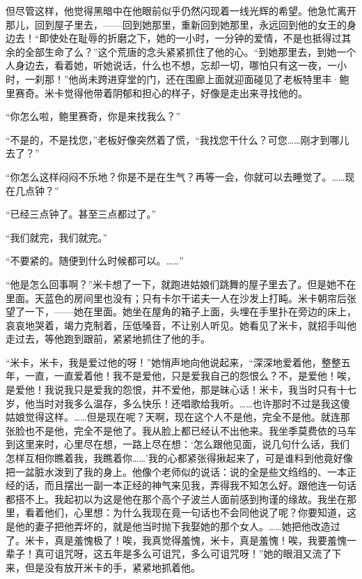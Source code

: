 \par 但尽管这样，他觉得黑暗中在他眼前似乎仍然闪现着一线光辉的希望。他急忙离开那儿，回到屋子里去，——回到她那里，重新回到她那里，永远回到他的女王的身边去！“即使处在耻辱的折磨之下，她的一小时，一分钟的爱情，不是也抵得过其余的全部生命了么？”这个荒唐的念头紧紧抓住了他的心。“到她那里去，到她一个人身边去，看着她，听她说话，什么也不想，忘却一切，哪怕只有这一夜，一小时，一刹那！”他尚未跨进穿堂的门，还在围廊上面就迎面碰见了老板特里丰·鲍里赛奇。米卡觉得他带着阴郁和担心的样子，好像是走出来寻找他的。
\par “你怎么啦，鲍里赛奇，你是来找我么？”
\par “不是的，不是找您，”老板好像突然着了慌，“我找您干什么？可您……刚才到哪儿去了？”
\par “你怎么这样闷闷不乐地？你是不是在生气？再等一会，你就可以去睡觉了。……现在几点钟？”
\par “已经三点钟了。甚至三点都过了。”
\par “我们就完，我们就完。”
\par “不要紧的。随便到什么时候都可以。……”
\par “他是怎么回事啊？”米卡想了一下，就跑进姑娘们跳舞的屋子里去了。但是她不在里面。天蓝色的房间里也没有；只有卡尔干诺夫一人在沙发上打盹。米卡朝帘后张望了一下，——她在里面。她坐在屋角的箱子上面，头埋在手里扑在旁边的床上，哀哀地哭着，竭力克制着，压低嗓音，不让别人听见。她看见了米卡，就招手叫他走过去，等他跑到跟前，紧紧地抓住了他的手。
\par “米卡，米卡，我是爱过他的呀！”她悄声地向他说起来，“深深地爱着他，整整五年，一直，一直爱着他！我不是爱他，只是爱我自己的怨恨么？不，是爱他！唉，是爱他！我说我只是爱我的怨恨，并不爱他，那是昧心话！米卡，我当时只有十七岁，他当时对我多么温存，多么快乐！还唱歌给我听。……也许那时不过是我这傻姑娘觉得这样。……但是现在呢？天啊，现在这个人不是他，完全不是他。就连那张脸也不是他，完全不是他了。我从脸上都已经认不出他来。我坐季莫费依的马车到这里来时，心里尽在想，一路上尽在想：‘怎么跟他见面，说几句什么话，我们怎样互相你瞧着我，我瞧着你……’我的心都紧张得揪起来了，可是谁料到他竟好像把一盆脏水泼到了我的身上。他像个老师似的说话：说的全是些文绉绉的、一本正经的话，而且摆出一副一本正经的神气来见我，弄得我不知怎么好。跟他连一句话都搭不上。我起初以为这是他在那个高个子波兰人面前感到拘谨的缘故。我坐在那里，看着他们，心里想：为什么我现在竟一句话也不会同他说了呢？你要知道，这是他的妻子把他弄坏的，就是他当时抛下我娶她的那个女人。……她把他改造过了。米卡，真是羞愧极了！唉，我真觉得羞愧，米卡，真是羞愧！唉，我要羞愧一辈子！真可诅咒呀，这五年是多么可诅咒，多么可诅咒呀！”她的眼泪又流了下来，但是没有放开米卡的手，紧紧地抓着他。
